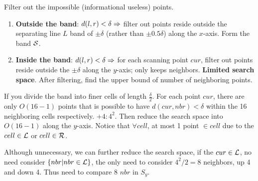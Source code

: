 \documentclass[a4paper]{report}
\begin{document}
Filter out the impossible (informational useless) points. 
\begin{enumerate}
\item \textbf{Outside the band}: $d(l, r)<\delta \Rightarrow$ filter out points reside outside the separating line $L$ band of $\pm\delta$ (rather than $\pm0.5\delta$) along the $x$-axis. Form the band $\mathcal{S}$. 
\item \textbf{Inside the band}: $d(l, r)<\delta \Rightarrow$ for each scanning point $cur$,  filter out points reside outside the $\pm\delta$ along the $y$-axis; only keeps neighbors. \textbf{Limited search space}. After filtering, find the upper bound of number of neighboring points.  
\end{enumerate}

If you divide the band into finer cells of length $\frac{\delta}{2}$. For each point $cur$, there are only $O(16-1)$ points that is possible to have $d(cur, nbr)<\delta$ within the 16 neighboring cells respectively. $+4: 4^2$. Then reduce the search space into $O(16-1)$ along the $y$-axis. Notice that $\forall cell$, at most 1 point $\in cell$ due to the $cell \in \mathcal{L}$ or $cell \in \mathcal{R}$.

Although unnecessary, we can further reduce the search space, if the $cur\in \mathcal{L}$, no need consider $\{nbr|nbr\in \mathcal{L}\}$, the only need to consider $4^2/2=8$ neighbors, up 4 and down 4. Thus need to compare 8 $nbr$ in $S_y$. 
\end{document}

